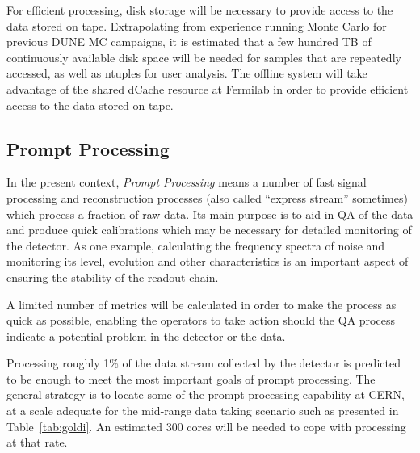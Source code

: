 For efficient processing, disk storage will be necessary to provide access to the data stored on tape.
Extrapolating from experience running Monte Carlo for previous DUNE MC campaigns,
it is estimated that  a few hundred TB of continuously available disk space will be needed for samples that are repeatedly
accessed, as well as ntuples for user analysis.  The offline system will take advantage of the shared dCache resource
at Fermilab in order to provide efficient access to the data stored on tape.


\subsection{Prompt Processing}
\label{sec:prompt_processing}

In the present context, \textit{Prompt Processing} means a number of fast signal processing and reconstruction processes
(also called ``express stream'' sometimes) which process a fraction of raw data. Its main purpose is to aid in QA of the data
and produce quick calibrations which may be necessary for detailed monitoring of the detector. As one example,
calculating the frequency spectra of noise and monitoring its level, evolution and other characteristics is an important aspect of ensuring
the stability of the readout chain.

A limited number of metrics will be calculated in order to make the process as quick as possible, enabling
the operators to take action should the QA process indicate a potential problem in the detector or the data.

Processing roughly 1\% of the data stream collected by the detector is predicted to
be enough to meet the most important goals of prompt processing. 
The general strategy is to locate some of the prompt processing capability at CERN, at a scale adequate for the mid-range
data taking scenario such as presented in Table\, \ref{tab:goldi}. An estimated 300 cores
will be needed to cope with processing at that rate.

